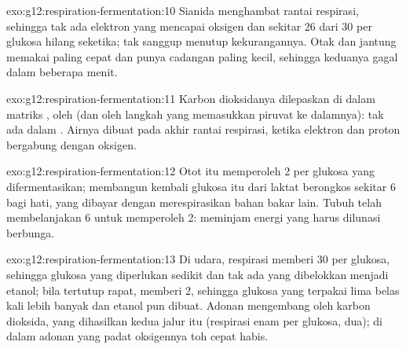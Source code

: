 \begin{solution}{exo:g12:respiration-fermentation:10}
Sianida menghambat rantai respirasi, sehingga tak ada elektron yang
mencapai oksigen dan sekitar 26 dari 30  per glukosa hilang
seketika;  tak sanggup menutup kekurangannya. Otak dan
jantung memakai  paling cepat dan punya cadangan paling kecil,
sehingga keduanya gagal dalam beberapa menit.
\end{solution}

\begin{solution}{exo:g12:respiration-fermentation:11}
Karbon dioksidanya dilepaskan di dalam matriks , oleh
 (dan oleh langkah yang memasukkan piruvat ke dalamnya):
tak ada dalam . Airnya dibuat pada akhir rantai respirasi,
ketika elektron dan proton bergabung dengan oksigen.
\end{solution}

\begin{solution}{exo:g12:respiration-fermentation:12}
Otot itu memperoleh 2  per glukosa yang difermentasikan; membangun
kembali glukosa itu dari laktat berongkos sekitar 6  bagi hati, yang
dibayar dengan merespirasikan bahan bakar lain. Tubuh telah
membelanjakan 6 untuk memperoleh 2:  meminjam energi yang
harus dilunasi berbunga.
\end{solution}

\begin{solution}{exo:g12:respiration-fermentation:13}
Di udara, respirasi memberi 30  per glukosa, sehingga glukosa yang
diperlukan sedikit dan tak ada yang dibelokkan menjadi etanol; bila
tertutup rapat,  memberi 2, sehingga glukosa yang terpakai
lima belas kali lebih banyak dan etanol pun dibuat. Adonan mengembang
oleh karbon dioksida, yang dihasilkan kedua jalur itu (respirasi enam
per glukosa,  dua); di dalam adonan yang padat oksigennya
toh cepat habis.
\end{solution}

